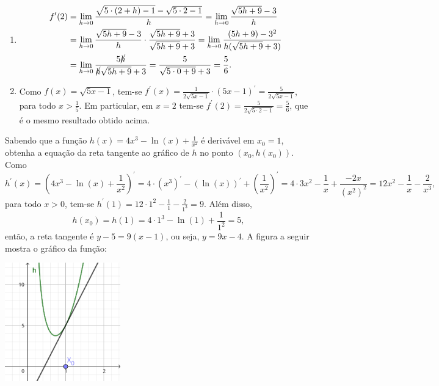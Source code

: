 \documentclass[12pt,a4paper]{article}
\begin{document}
\begin{ExerciseList}
\Answer
\begin{enumerate}
\item
\begin{align*}
f^\prime(2)
& = \lim_{h \to 0} \frac{\sqrt{5\cdot (2+h) - 1} - \sqrt{5\cdot 2 - 1}}{h}
  = \lim_{h \to 0} \frac{\sqrt{5h + 9} - 3}{h} \\
& = \lim_{h \to 0} \frac{\sqrt{5h + 9} - 3}{h} \cdot \frac{\sqrt{5h + 9} + 3}{\sqrt{5h + 9} + 3}
  = \lim_{h \to 0} \frac{(5h + 9) - 3^2}{h (\sqrt{5h + 9} + 3)} \\
  &
  = \lim_{h \to 0} \frac{5\cancel{h}}{\cancel{h}\sqrt{5h + 9} + 3}
  = \frac{5}{\sqrt{5\cdot 0 + 9} + 3}
  = \frac{5}{6}.
\end{align*}
\item Como $f(x) = \sqrt{5x - 1}$, tem-se $f^\prime(x) = \frac{1}{2\sqrt{5x - 1}} \cdot (5x - 1)^\prime = \frac{5}{2\sqrt{5x - 1}}$, para todo $x > \frac{1}{5}$. Em particular, em $x = 2$ tem-se $f^\prime(2) = \frac{5}{2 \sqrt{5 \cdot 2 - 1}} = \frac{5}{6}$, que é o mesmo resultado obtido acima.
\end{enumerate}

\Exercise[title={2,0}] Sabendo que a função $h(x) = 4x^3 - \ln(x) + \frac{1}{x^2}$ é derivável em $x_0 = 1$, obtenha a equação da reta tangente ao gráfico de $h$ no ponto $(x_0, h(x_0))$.
\Answer Como
\[
  h^\prime(x)
  = \left(4x^3 - \ln(x) + \frac{1}{x^2}\right)^\prime
  = 4\cdot\left(x^3\right)^\prime - \left(\ln(x)\right)^\prime + \left(\frac{1}{x^2}\right)^\prime
  = 4\cdot 3x^2 - \frac{1}{x} + \frac{-2x}{(x^2)^2}
  = 12x^2 - \frac{1}{x} - \frac{2}{x^3},
\]
para todo $x > 0$, tem-se $h^\prime(1) = 12\cdot 1^2 - \frac{1}{1} - \frac{2}{1^3} = 9$. Além disso,
\[
  h(x_0) = h(1) = 4\cdot 1^3 - \ln(1) + \frac{1}{1^2} = 5,
\]
então, a reta tangente é $y-5 = 9 (x-1)$, ou seja, $y = 9x-4$. A figura a seguir mostra o gráfico da função:
\begin{center}
\includegraphics[width=5cm]{img/prova-2-nex-reta-tangente.pdf}
\end{center}



\end{ExerciseList}
\end{document}

